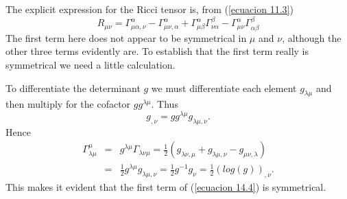 The explicit expression for the Ricci tensor is, from (\ref{ecuacion 11.3})
\begin{equation}
 \label{ecuacion 14.4}
 R_{\mu\nu} = \Gamma^{\alpha}_{\mu\alpha,\nu} - \Gamma^{\alpha}_{\mu\nu,\alpha}
 + \Gamma^{\alpha}_{\mu\beta}\Gamma^{\beta}_{\nu\alpha} - \Gamma^{\alpha}_{\mu\nu}\Gamma^{\beta}_{\alpha\beta}
\end{equation}
The first term here does not appear to be symmetrical in $\mu$ and $\nu$, although the other three terms evidently are. 
To establish that the first term really is symmetrical we need a little calculation.

To differentiate the determinant $g$ we must differentiate each element $g_{\lambda\mu}$ and then multiply for the 
cofactor $g g^{\lambda\mu}$. Thus
\begin{equation}
 \label{ecuacion 14.5}
 g_{,\nu} = g g^{\lambda\mu} g_{\lambda\mu,\nu}.
\end{equation}
Hence 
\begin{equation}
 \label{ecuacion 14.6}
 \begin{array}{rcl}
    \Gamma^{\mu}_{\lambda\mu} & = & g^{\lambda\mu}\Gamma_{\lambda\nu\mu} =
    \frac{1}{2}\left(
        g_{\lambda\nu,\mu} + g_{\lambda\mu,\nu} - g_{\mu\nu,\lambda}
    \right)\\
    & = & \frac{1}{2} g^{\lambda\mu} g_{\lambda\mu,\nu} = \frac{1}{2} g^{-1}g_{\nu}
    = \frac{1}{2} \left( log(g) \right)_{,\nu}.
 \end{array}
\end{equation}
This makes it evident that the first term of (\ref{ecuacion 14.4}) is symmetrical.



